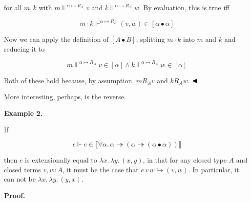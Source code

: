 for all $m,k$ with $m\Vdash^{\alpha\mapsto R_{A}}v$ and $k\Vdash^{\alpha\mapsto R_{A}}w$. By evaluation, this is true iff\par
  
\par  \quad  \[m\cdot k\Vdash^{\alpha\mapsto R_{A}}(v,w)\in[\alpha\bullet\alpha]\]\quad  \quad  
  
Now we can apply the definition of $[A\bullet B]$, splitting $m\cdot k$ into $m$ and $k$ and reducing it to\par
  
\par  \quad  \[m\Vdash^{\alpha\mapsto R_{A}}v\in[\alpha]\land k\Vdash^{\alpha\mapsto R_{A}}w\in[\alpha]\]\quad  \quad  
  
Both of these hold because, by assumption, $m\mathrel{R_{A}}v$ and $k\mathrel{R_{A}}w$. $\hfill\blacktriangleleft$\par
 
 
 
More interesting, perhaps, is the reverse.\par
 
 
 
\par\medskip\noindent\textbf{Example 2.}\par
 
 
If\par
  
\par  \quad  \[\epsilon\Vdash e\in\llbracket\forall\alpha.\,\alpha\twoheadrightarrow(\alpha\twoheadrightarrow(\alpha\bullet\alpha))\rrbracket\]\quad  \quad  
  
then $e$ is extensionally equal to $\lambda x.\,\lambda y.\,(x,y)$, in that for any closed type $A$ and closed terms $v,w:A$, it must be the case that $e\,v\,w\hookrightarrow(v,w)$. In particular, it can not be $\lambda x.\,\lambda y.\,(y,x)$.\par
 
 
 
 
 
\par\medskip\noindent\textbf{Proof.}\par
 
